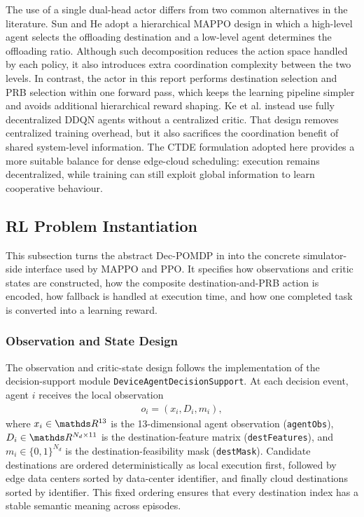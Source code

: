 The use of a single dual-head actor differs from two common alternatives in the literature. Sun and He \cite{sun2023hdmappo} adopt a hierarchical MAPPO design in which a high-level agent selects the offloading destination and a low-level agent determines the offloading ratio. Although such decomposition reduces the action space handled by each policy, it also introduces extra coordination complexity between the two levels. In contrast, the actor in this report performs destination selection and PRB selection within one forward pass, which keeps the learning pipeline simpler and avoids additional hierarchical reward shaping. Ke et al. \cite{ke2022demadrl} instead use fully decentralized DDQN agents without a centralized critic. That design removes centralized training overhead, but it also sacrifices the coordination benefit of shared system-level information. The CTDE formulation adopted here provides a more suitable balance for dense edge-cloud scheduling: execution remains decentralized, while training can still exploit global information to learn cooperative behaviour.

\subsection{RL Problem Instantiation}
\label{subsec:rl-problem-instantiation}

This subsection turns the abstract Dec-POMDP in  into the concrete simulator-side interface used by MAPPO and PPO. It specifies how observations and critic states are constructed, how the composite destination-and-PRB action is encoded, how fallback is handled at execution time, and how one completed task is converted into a learning reward.

\subsubsection{Observation and State Design}
\label{subsec:observation-state}

The observation and critic-state design follows the implementation of the decision-support module \texttt{DeviceAgentDecisionSupport}. At each decision event, agent \(i\) receives the local observation
\begin{align}
o_i = \left(x_i, D_i, m_i\right),
\end{align}
where \(x_i \in \R^{13}\) is the 13-dimensional agent observation (\texttt{agentObs}), \(D_i \in \R^{N_d \times 11}\) is the destination-feature matrix (\texttt{destFeatures}), and \(m_i \in \{0,1\}^{N_d}\) is the destination-feasibility mask (\texttt{destMask}). Candidate destinations are ordered deterministically as local execution first, followed by edge data centers sorted by data-center identifier, and finally cloud destinations sorted by identifier. This fixed ordering ensures that every destination index has a stable semantic meaning across episodes.

